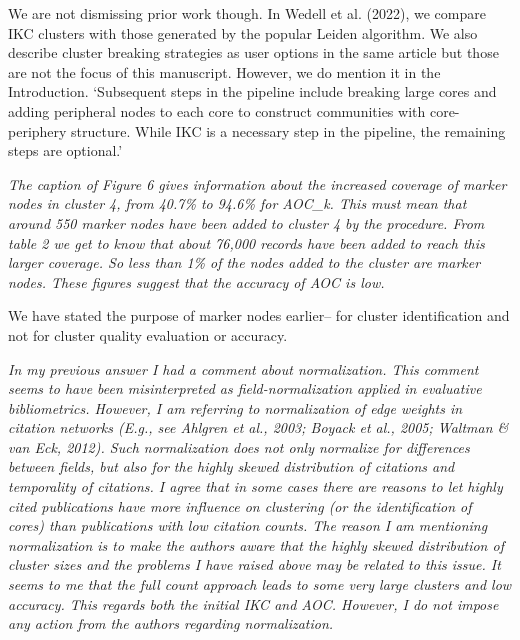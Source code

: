 \documentclass[11pt, oneside]{article}   	%
\begin{document}
We are not dismissing prior work though. In Wedell et al. (2022), we compare IKC clusters with those generated by the popular Leiden algorithm. We also describe cluster breaking strategies as user options in the same article but those are not the focus of this manuscript. However, we do mention it in the Introduction. `Subsequent steps in the pipeline include breaking large cores and adding peripheral nodes to each core to construct communities with core-periphery structure. While IKC is a necessary step in the pipeline, the remaining steps are optional.'

\vspace{2 mm} 
 \emph{The caption of Figure 6 gives information about the increased coverage of marker nodes in cluster 4, from 40.7\% to 94.6\% for AOC\_k. This must mean that around 550 marker nodes have been added to cluster 4 by the procedure. From table 2 we get to know that about 76,000 records have been added to reach this larger coverage. So less than 1\% of the nodes added to the cluster are marker nodes. These figures suggest that the accuracy of AOC is low.}
\vspace{2 mm} 

\vspace{2 mm} 
We have stated the purpose of marker nodes earlier-- for cluster identification and not for cluster quality evaluation or accuracy.

\vspace{2 mm} 
 \emph{ In my previous answer I had a comment about normalization. This comment seems to have been misinterpreted as field-normalization applied in evaluative bibliometrics. However, I am referring to normalization of edge weights in citation networks (E.g., see Ahlgren et al., 2003; Boyack et al., 2005; Waltman \& van Eck, 2012). Such normalization does not only normalize for differences between fields, but also for the highly skewed distribution of citations and temporality of citations. I agree that in some cases there are reasons to let highly cited publications have more influence on clustering (or the identification of cores) than publications with low citation counts. The reason I am mentioning normalization is to make the authors aware that the highly skewed distribution of cluster sizes and the problems I have raised above may be related to this issue. It seems to me that the full count approach leads to some very large clusters and low accuracy. This regards both the initial IKC and AOC. However, I do not impose any action from the authors regarding normalization.}
 
\end{document}
